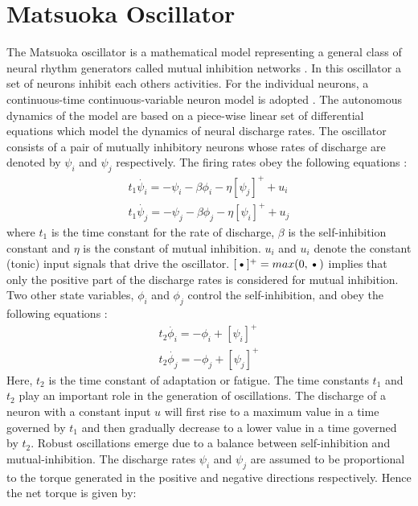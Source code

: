 \documentclass[12pt,twoside]{article}
\theoremstyle{plain}
\theoremstyle{definition}
\theoremstyle{remark}
\newcommand{\forceindent}{\leavevmode{\parindent=2em\indent}}
\begin{document}
\section{Matsuoka Oscillator}
\label{sec:Matsuoka_Oscillator}
\forceindent The Matsuoka oscillator is a mathematical model representing a general class of neural rhythm generators called mutual inhibition networks \cite{Matsuoka1987}. In this oscillator a set of neurons inhibit each others activities. For the individual neurons, a continuous-time continuous-variable neuron model is adopted \cite{Matsuoka1987}. The autonomous dynamics of the model are based on a piece-wise linear set of differential equations which model the dynamics of neural discharge rates. The oscillator consists of a pair of mutually inhibitory neurons whose rates of discharge are denoted by $\psi_i$ and $\psi_j$ respectively. The firing rates obey the following equations \cite{Ronsse2009}: 
\begin{subequations} 
\begin{align}
 t_1 \dot{\psi_i}=-\psi_i - \beta \phi_i - \eta [\psi_j]^+ + u_i\\
 t_1 \dot{\psi_j}=-\psi_j - \beta \phi_j - \eta [\psi_i]^+ + u_j
 \end{align}
\end{subequations}
where $t_1$ is the time constant for the rate of discharge, $\beta$ is the self-inhibition constant and $\eta$ is the constant of mutual inhibition. $u_i$ and $u_i$ denote the constant (tonic) input signals that drive the oscillator. $[\textbf{\textbullet}]^+=max(0,\textbf{\textbullet})$ implies that only the positive part of the discharge rates is considered for mutual inhibition. Two other state variables, $\phi_i$ and $\phi_j$ control the self-inhibition, and obey the following equations \cite{Ronsse2009}: 
\begin{subequations} 
\begin{align}
 t_2 \dot{\phi_i}=-\phi_i + [\psi_i]^+\\
 t_2 \dot{\phi_j}=-\phi_j + [\psi_j]^+
 \end{align}
\end{subequations}
Here, $t_2$ is the time constant of adaptation or fatigue. The time constants $t_1$ and $t_2$ play an important role in the generation of oscillations. The discharge of a neuron with a constant input $u$ will first rise to a maximum value in a time governed by $t_1$ and then gradually decrease to a lower value in a time governed by $t_2$. Robust oscillations emerge due to a balance between self-inhibition and mutual-inhibition. The discharge rates $\psi_i$ and $\psi_j$ are assumed to be proportional to the torque generated in the positive and negative directions respectively. Hence the net torque is given by: 
\end{document}
